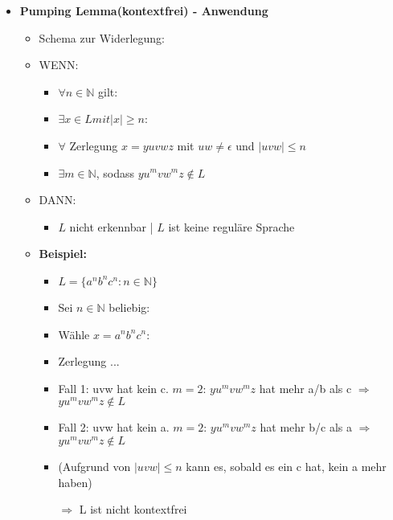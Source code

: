 \begin{itemize}
\item {\large \textbf{Pumping Lemma(kontextfrei) - Anwendung}}
	\begin{itemize}
	\item Schema zur Widerlegung:
	\item WENN: 
		\begin{itemize}
		\item $\forall n \in \mathbb{N}$ gilt:
		\item $\exists x \in L mit |x| \geq n$:
		\item $\forall$ Zerlegung $x=yuvwz$ mit $uw \neq \epsilon$ und $|uvw| \leq n$
		\item $\exists m \in \mathbb{N}$, sodass $yu^mvw^mz \notin L$
		\end{itemize}
	\item DANN: 
		\begin{itemize}
		\item $L$ nicht erkennbar | $L$ ist keine reguläre Sprache
		\end{itemize}
	\item[]
	\item \textbf{Beispiel:}
		\begin{itemize}
		\item $L=\{a^nb^nc^n: n \in \mathbb{N}\}$
		\item Sei $n \in \mathbb{N}$ beliebig:
		\item Wähle $x = a^nb^nc^n$:
		\item Zerlegung ...
		\item Fall 1: uvw hat kein c. $m=2$: $yu^mvw^mz$ hat mehr a/b als c $\Rightarrow$ $yu^mvw^mz \notin L$
		\item Fall 2: uvw hat kein a. $m=2$: $yu^mvw^mz$ hat mehr b/c als a $\Rightarrow$ $yu^mvw^mz \notin L$
		\item (Aufgrund von $|uvw| \leq n$ kann es, sobald es ein c hat, kein a mehr haben)
		\item[$\Rightarrow$] L ist nicht kontextfrei
		\end{itemize}
	\end{itemize}

\pagebreak


\end{itemize}
